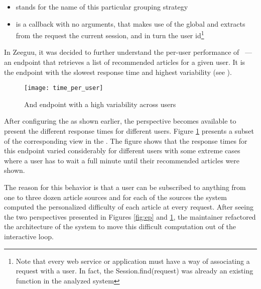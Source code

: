 \begin{itemize}
	\item {} stands for the name of this particular grouping strategy
	\item {} is a callback with no arguments, 
	that makes use of the global  and extracts from 
	the request the current session, and in turn the user id\footnote{
		Note that every web service or application must have a way of 
		associating a request with a user. In fact, the Session.find(request) 
		was already an existing function in the analyzed system}
\end{itemize}


In Zeeguu, it was decided to further understand the per-user performance of \epFeedItems
~---  an endpoint that retrieves a list of recommended articles for a given user.
It is the endpoint with the slowest response time and highest variability (see ). 


\begin{figure}[h!]
  \centering
  \texttt{[image: time\_per\_user]}
  \caption{And endpoint with a high variability across users}
  \label{fig:tpu}
\end{figure}


After configuring the \tool as shown earlier, the  perspective becomes available to  present the different response times for different users. Figure \ref{fig:tpu} presents a subset of the corresponding view in the \tool. The figure shows that the response times for this endpoint varied considerably for different users with some extreme cases where a user has to wait a full minute until their recommended articles were shown. 

The reason for this behavior is that a user can be subscribed to anything from one to three dozen 
article sources and for each of the sources the system computed the personalized difficulty 
of each article at every request. After seeing the two perspectives presented in Figures \ref{fig:ep} and \ref{fig:tpu}, the \zee maintainer refactored the architecture of the system to move this difficult computation out of the interactive loop.






